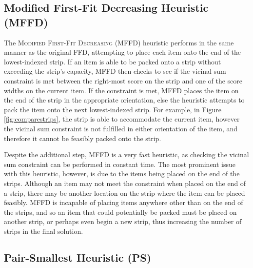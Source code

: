 \documentclass[oribibl]{llncs}
\begin{document}
\subsection{Modified First-Fit Decreasing Heuristic (MFFD)}
\label{sec:mffd}
The \textsc{Modified First-Fit Decreasing} (MFFD) heuristic performs in the same manner as the original FFD, attempting to place each item onto the end of the lowest-indexed strip. If an item is able to be packed onto a strip without exceeding the strip's capacity, MFFD then checks to see if the vicinal sum constraint is met between the right-most score on the strip and one of the score widths on the current item. If the constraint is met, MFFD places the item on the end of the strip in the appropriate orientation, else the heuristic attempts to pack the item onto the next lowest-indexed strip. For example, in Figure \ref{fig:comparestrips}, the strip is able to accommodate the current item, however the vicinal sum constraint is not fulfilled in either orientation of the item, and therefore it cannot be feasibly packed onto the strip.

Despite the additional step, MFFD is a very fast heuristic, as checking the vicinal sum constraint can be performed in constant time. The most prominent issue with this heuristic, however, is due to the items being placed on the end of the strips. Although an item may not meet the constraint when placed on the end of a strip, there may be another location on the strip where the item can be placed feasibly. MFFD is incapable of placing items anywhere other than on the end of the strips, and so an item that could potentially be packed must be placed on another strip, or perhaps even begin a new strip, thus increasing the number of strips in the final solution.



\subsection{Pair-Smallest Heuristic (PS)}
\label{sec:ps}
\end{document}

